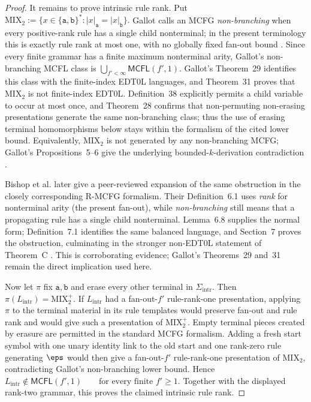\begin{proof}
It remains to prove intrinsic rule rank.  Put
\(\mathrm{MIX}_2 :=\{x\in\{\mathtt a,\mathtt b\}^*: |x|_{\mathtt a}=|x|_{\mathtt b}\}.\)
Gallot calls an MCFG \emph{non-branching} when every positive-rank rule has a
single child nonterminal; in the present terminology this is exactly rule
rank at most one, with no globally fixed fan-out bound
\cite[Definition~38]{Gallot2021}.  Since every finite grammar has a finite
maximum nonterminal arity, Gallot's non-branching MCFL class is
\(\bigcup_{f'<\infty}\mathsf{MCFL}(f',1).\)
Gallot's Theorem~29 identifies this class with the finite-index EDT0L
languages, and Theorem~31 proves that
$\mathrm{MIX}_2$ is not finite-index EDT0L.
Definition~38 explicitly permits a child variable to
occur at most once, and Theorem~28 confirms that
non-permuting non-erasing presentations generate
the same non-branching class; thus the use of
erasing terminal homomorphisms below stays within
the formalism of the cited lower bound.  Equivalently,
$\mathrm{MIX}_2$ is not generated by any non-branching MCFG; Gallot's
Propositions~5--6 give the underlying bounded-$k$-derivation contradiction
\cite[Theorem~29, Theorem~31, Propositions~5--6]{Gallot2021}.

Bishop et al. later give a peer-reviewed expansion of the same obstruction in
the closely corresponding R-MCFG formalism.  Their Definition~6.1 uses
\emph{rank} for nonterminal arity (the present fan-out), while
\emph{non-branching} still means that a propagating rule has a single child
nonterminal.  Lemma~6.8 supplies the normal form; Definition~7.1 identifies
the same balanced language, and Section~7 proves the obstruction, culminating
in the stronger non-EDT0L statement of Theorem~C
\cite[Definition~6.1, Lemma~6.8, Definition~7.1, Section~7,
Theorem~C]{BishopEtAl2026EDT0L}.  This is corroborating evidence; Gallot's
Theorems~29 and~31 remain the direct implication used here.

Now let $\pi$ fix $\mathtt a,\mathtt b$ and erase every other terminal in
$\Sigma_{\mathrm{intr}}$.  Then
\(\pi(L_{\mathrm{intr}})=\mathrm{MIX}_2^+.\)
If $L_{\mathrm{intr}}$ had a fan-out-$f'$ rule-rank-one presentation,
applying $\pi$ to the terminal material in its rule templates would preserve
fan-out and rule rank and would give such a presentation of
$\mathrm{MIX}_2^+$.  Empty terminal pieces created by erasure are permitted
in the standard MCFG formalism.  Adding a fresh start symbol with one unary
identity link to the old start and one rank-zero rule generating $\eps$ would
then give a fan-out-$f'$ rule-rank-one presentation of $\mathrm{MIX}_2$,
contradicting Gallot's non-branching lower bound.  Hence
\(L_{\mathrm{intr}}\notin\mathsf{MCFL}(f',1) \qquad\text{for every finite }f'\ge1.\)
Together with the displayed rank-two grammar, this proves the claimed
intrinsic rule rank.
\end{proof}

